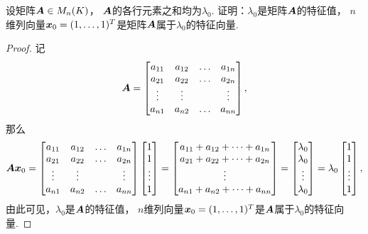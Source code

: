 \begin{example}\label{example:特征值与特征向量.各行元素之和相同的矩阵的特征值与特征向量}
设矩阵\(\boldsymbol{A} \in M_n(K)\)，
\(\boldsymbol{A}\)的各行元素之和均为\(\lambda_0\).
证明：\(\lambda_0\)是矩阵\(\boldsymbol{A}\)的特征值，
\(n\)维列向量\(\boldsymbol{x}_0=(1,\dotsc,1)^T\)是矩阵\(\boldsymbol{A}\)属于\(\lambda_0\)的特征向量.
\begin{proof}
记\begin{equation*}
	\boldsymbol{A}
	= \begin{bmatrix}
		a_{11} & a_{12} & \dots & a_{1n} \\
		a_{21} & a_{22} & \dots & a_{2n} \\
		\vdots & \vdots & & \vdots \\
		a_{n1} & a_{n2} & \dots & a_{nn}
	\end{bmatrix},
\end{equation*}
那么\begin{equation*}
	\boldsymbol{A} \boldsymbol{x}_0
	= \begin{bmatrix}
		a_{11} & a_{12} & \dots & a_{1n} \\
		a_{21} & a_{22} & \dots & a_{2n} \\
		\vdots & \vdots & & \vdots \\
		a_{n1} & a_{n2} & \dots & a_{nn}
	\end{bmatrix}
	\begin{bmatrix}
		1 \\ 1 \\ \vdots \\ 1
	\end{bmatrix}
	= \begin{bmatrix}
		a_{11} + a_{12} + \dotsb + a_{1n} \\
		a_{21} + a_{22} + \dotsb + a_{2n} \\
		\vdots \\
		a_{n1} + a_{n2} + \dotsb + a_{nn}
	\end{bmatrix}
	= \begin{bmatrix}
		\lambda_0 \\ \lambda_0 \\ \vdots \\ \lambda_0
	\end{bmatrix}
	= \lambda_0
	\begin{bmatrix}
		1 \\ 1 \\ \vdots \\ 1
	\end{bmatrix},
\end{equation*}
由此可见，\(\lambda_0\)是\(\boldsymbol{A}\)的特征值，
\(n\)维列向量\(\boldsymbol{x}_0=(1,\dotsc,1)^T\)是\(\boldsymbol{A}\)属于\(\lambda_0\)的特征向量.
\end{proof}
\end{example}

